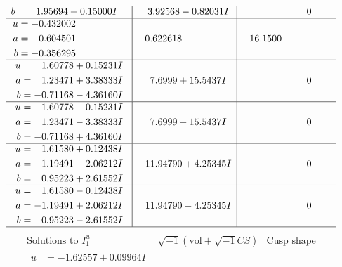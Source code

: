 \documentclass[1p]{elsarticle_modified}
\theoremstyle{definition}
\newcommand{\I}{\sqrt{-1}}
\begin{document}
$$\begin{array}{c|c|c}
\begin{aligned}
b &= \phantom{-}1.95694 + 0.15000 I\end{aligned}
 & \phantom{-}3.92568 - 0.82031 I & \phantom{-0.000000 } 0 \\ \hline\begin{aligned}
u &= -0.432002\phantom{ +0.000000I} \\
a &= \phantom{-}0.604501\phantom{ +0.000000I} \\
b &= -0.356295\phantom{ +0.000000I}\end{aligned}
 & \phantom{-}0.622618\phantom{ +0.000000I} & \phantom{-}16.1500\phantom{ +0.000000I} \\ \hline\begin{aligned}
u &= \phantom{-}1.60778 + 0.15231 I \\
a &= \phantom{-}1.23471 + 3.38333 I \\
b &= -0.71168 - 4.36160 I\end{aligned}
 & \phantom{-}7.6999 + 15.5437 I & \phantom{-0.000000 } 0 \\ \hline\begin{aligned}
u &= \phantom{-}1.60778 - 0.15231 I \\
a &= \phantom{-}1.23471 - 3.38333 I \\
b &= -0.71168 + 4.36160 I\end{aligned}
 & \phantom{-}7.6999 - 15.5437 I & \phantom{-0.000000 } 0 \\ \hline\begin{aligned}
u &= \phantom{-}1.61580 + 0.12438 I \\
a &= -1.19491 - 2.06212 I \\
b &= \phantom{-}0.95223 + 2.61552 I\end{aligned}
 & \phantom{-}11.94790 + 4.25345 I & \phantom{-0.000000 } 0 \\ \hline\begin{aligned}
u &= \phantom{-}1.61580 - 0.12438 I \\
a &= -1.19491 + 2.06212 I \\
b &= \phantom{-}0.95223 - 2.61552 I\end{aligned}
 & \phantom{-}11.94790 - 4.25345 I & \phantom{-0.000000 } 0\\
 \hline 
 \end{array}$$\newpage$$\begin{array}{c|c|c}  
\text{Solutions to }I^u_{1}& \I (\text{vol} + \sqrt{-1}CS) & \text{Cusp shape}\\
 \hline 
\begin{aligned}
u &= -1.62557 + 0.09964 I \\

\end{aligned}
\end{array}$$
\end{document}

